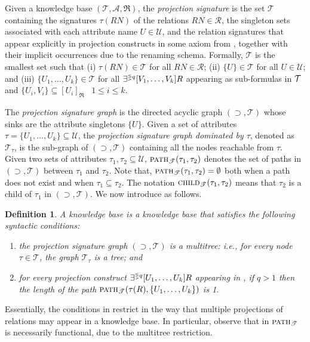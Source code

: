 \documentclass[draft]{article}
\newcommand{\pth}[2]{\ensuremath{\textsc{path}_{\mathscr{T}}(#1,#2)}\xspace}
\newcommand{\chd}[2]{\ensuremath{\textsc{child}_{\mathscr{T}}(#1,#2)}\xspace}
\newtheorem{definition}{Definition}
\begin{document}
Given a \DLRp knowledge base $(\mathcal{T}\!,\mathcal{A},\Re)$, the \emph{projection signature} is the set $\mathscr{T}$ containing the signatures $\tau(R\!N)$ of the relations $R\!N\in\mathcal{R}$, the singleton sets associated with each attribute name $U\in\mathcal{U}$, and the relation signatures that appear explicitly in projection constructs in some axiom from \Tmc, together with their implicit occurrences due to the renaming schema. Formally, $\mathscr{T}$ is the smallest set such that
%
	(i) $\tau(R\!N)\in\mathscr{T}$ for all $R\!N\in\mathcal{R}$; 
	(ii) $\{U\}\in\mathscr{T}$ for all $U\in\mathcal{U}$; and
	(iii) $\{U_1,\ldots,U_k\}\in\mathscr{T}$ for all $\exists^{{\scriptscriptstyle\lesseqgtr} q} [V_1,\ldots,V_k]R$ appearing as sub-formulas in $\mathcal{T}$ and 
		$\{U_i,V_i\}\subseteq [U_i]_\Re $ ~$1\!\leq\!i\!\leq\!k$. 

The \emph{projection signature graph} is the directed acyclic graph $(\supset,\mathscr{T})$ whose sinks are the attribute singletons $\{U\}$.
%
Given a set of attributes $\tau=\{U_1,\ldots,U_k\}\subseteq\mathcal{U}$, the \emph{projection signature graph dominated by $\tau$}, denoted as $\mathscr{T}_\tau$, is the sub-graph of $(\supset,\mathscr{T})$ containing all the nodes reachable from $\tau$.
%
%
Given two sets of attributes $\tau_1,\tau_2\subseteq\mathcal{U}$, $\pth{\tau_1}{\tau_2}$ denotes the set of paths in 
$(\supset,\mathscr{T})$ between $\tau_1$ and $\tau_2$. Note that, $\pth{\tau_1}{\tau_2}=\emptyset$ both when a path 
does not exist and when $\tau_1\subseteq \tau_2$.
The notation $\chd{\tau_1}{\tau_2}$ means that ${\tau_2}$ is a child of ${\tau_1}$ in $(\supset,\mathscr{T})$.
%
We now introduce \DLRpm as follows.
%
\begin{definition}
	A \emph{\DLRpm knowledge base} is a \DLRp knowledge base that satisfies the following syntactic conditions: 
	\begin{enumerate}
		\item the projection signature graph $(\supset,\mathscr{T})$ is a multitree: i.e., for every node $\tau\in\mathscr{T}$, the graph $\mathscr{T}_\tau$ is a tree; and 
		\item for every projection construct $\exists^{{\scriptscriptstyle\lesseqgtr} q} [U_1,\ldots,U_k]R$ appearing in \Tmc, if $q>1$ then the length of the path $\pth{\tau(R)}{\{U_1,\ldots,U_k\}}$ is 1. 
	\end{enumerate}
\end{definition}
%
Essentially, the conditions in \DLRpm restrict \DLRp in the way that multiple projections of relations may appear in a knowledge base.
In particular, observe that in \DLRpm $\textsc{path}_{\mathscr{T}}$ is necessarily functional, due to the multitree restriction. 
\end{document}
